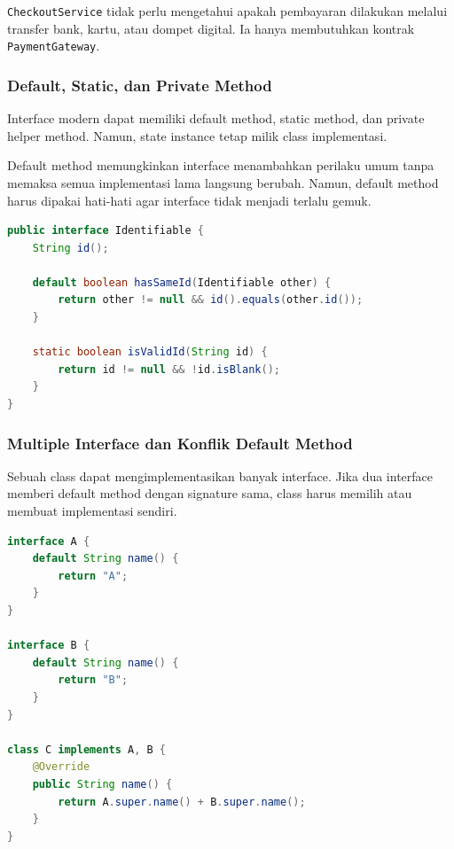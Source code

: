 \texttt{CheckoutService} tidak perlu mengetahui apakah pembayaran dilakukan melalui transfer bank, kartu, atau dompet digital. Ia hanya membutuhkan kontrak \texttt{PaymentGateway}.

\subsubsection{Default, Static, dan Private Method}

\begin{jawab}
Interface modern dapat memiliki default method, static method, dan private helper method. Namun, state instance tetap milik class implementasi.
\end{jawab}

Default method memungkinkan interface menambahkan perilaku umum tanpa memaksa semua implementasi lama langsung berubah. Namun, default method harus dipakai hati-hati agar interface tidak menjadi terlalu gemuk.

\begin{lstlisting}[language=Java, caption={Default dan static method pada interface}, label={lst:interface-default-static}]
public interface Identifiable {
    String id();

    default boolean hasSameId(Identifiable other) {
        return other != null && id().equals(other.id());
    }

    static boolean isValidId(String id) {
        return id != null && !id.isBlank();
    }
}
\end{lstlisting}

\subsubsection{Multiple Interface dan Konflik Default Method}

\begin{jawab}
Sebuah class dapat mengimplementasikan banyak interface. Jika dua interface memberi default method dengan signature sama, class harus memilih atau membuat implementasi sendiri.
\end{jawab}

\begin{lstlisting}[language=Java, caption={Resolusi konflik default method}, label={lst:default-conflict}]
interface A {
    default String name() {
        return "A";
    }
}

interface B {
    default String name() {
        return "B";
    }
}

class C implements A, B {
    @Override
    public String name() {
        return A.super.name() + B.super.name();
    }
}
\end{lstlisting}

